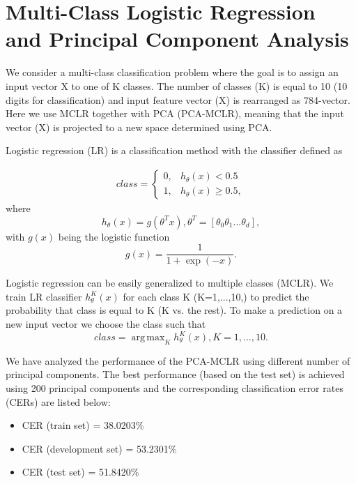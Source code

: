 \documentclass[a4paper,10pt,fleqn]{article}
\DeclareMathOperator*{\argmax}{arg\,max}
\begin{document}
\section{Multi-Class Logistic Regression and Principal Component Analysis}\label{sec:pca_mclr}

We consider a multi-class classification problem where the goal is to assign an input vector X to one of K classes.
The number of classes (K) is equal to 10 (10 digits for classification) and input feature vector (X) is rearranged as 784-vector.
Here we use MCLR together with PCA (PCA-MCLR), meaning that the input vector (X) is  projected to a new space determined using PCA.

Logistic regression (LR) is a classification method with the classifier defined as

\begin{equation}\label{eq:LR}
\begin{array}{lcl}
\displaystyle class= \left\{
\begin{array}{lr}
0, & h_{\theta}(x) < 0.5\\
1, &  h_{\theta}(x) \geq 0.5,
\end{array}
\right.
\end{array}
\end{equation}
where
\begin{equation}\label{eq:h}
h_{\theta}(x) = g(\theta^T x ), \theta^T = [\theta_0 \theta_1 ... \theta_d ],
\end{equation}
with $g(x)$ being the logistic function
\begin{equation}\label{eq:g}
g(x)=\frac{1}{1 + \exp(-x)}.
\end{equation}

Logistic regression can be easily generalized to multiple classes (MCLR).
We train LR classifier $h^K_{\theta}(x)$ for each class K (K=1,...,10,) to predict the probability that class is equal to K (K vs. the rest). To make a prediction on a new input vector we choose the class such that 
\begin{equation}\label{eq:mclr}
class = \argmax_K h^K_{\theta}(x),  {K}=1,...,10.
\end{equation}

We have analyzed the performance of the PCA-MCLR using different number of principal components.
The best performance (based on the test set) is achieved using 200 principal components and the corresponding classification error rates (CERs)  are listed below:
\begin{itemize}
\item CER (train set) = 38.0203\%
\item CER (development set) = 53.2301\%
\item CER (test set) = 51.8420\%
\end{itemize}
\end{document}
